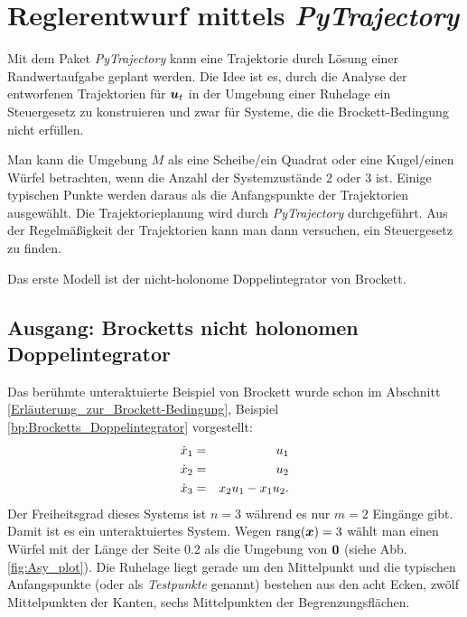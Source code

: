\section{Reglerentwurf mittels \emph{PyTrajectory}}
\label{sec:Reglerentwurf_mittels_PyTrajectory}
Mit dem Paket \emph{PyTrajectory} kann eine Trajektorie durch Lösung einer Randwertaufgabe geplant werden. Die Idee ist es, durch die Analyse der entworfenen Trajektorien für $\boldsymbol u_{t}$ in der Umgebung einer Ruhelage ein Steuergesetz zu konstruieren und zwar für Systeme, die die Brockett-Bedingung nicht erfüllen.

Man kann die Umgebung $M$ als eine Scheibe/ein Quadrat oder eine Kugel/einen Würfel betrachten, wenn die Anzahl der Systemzustände $2$ oder $3$ ist. Einige typischen Punkte werden daraus als die Anfangspunkte der Trajektorien ausgewählt. Die Trajektorieplanung wird durch \emph{PyTrajectory} durchgeführt. Aus der Regelmäßigkeit der Trajektorien kann man dann versuchen, ein Steuergesetz zu finden.   

Das erste Modell ist der nicht-holonome Doppelintegrator von Brockett. 

\subsection{Ausgang: Brocketts nicht holonomen Doppelintegrator}
\label{subs:Ausgang_Brocketts_nicht_holonimischer_Doppelintegrator}
Das berühmte unteraktuierte Beispiel von Brockett wurde schon im Abschnitt \ref{Erläuterung_zur_Brockett-Bedingung}, Beispiel \ref{bp:Brocketts_Doppelintegrator} vorgestellt:
\begin{eqnarray}
\dot{x}_{1} &=& u_{1}\notag\\
\dot{x}_{2} &=& u_{2}\notag\\
\dot{x}_{3} &=& x_{2}u_{1}-x_{1}u_{2}.
\label{eq:Brockett_Doppelintegrator_ch4}
\end{eqnarray}
Der Freiheitsgrad dieses Systems ist $n=3$ während es nur $m=2$ Eingänge gibt. Damit ist es ein unteraktuiertes System. Wegen $\mathrm{rang{(\boldsymbol x)}=3}$ wählt man einen Würfel mit der Länge der Seite $0.2$ als die Umgebung von $\boldsymbol 0$ (siehe Abb. \ref{fig:Asy_plot}). Die Ruhelage liegt gerade um den Mittelpunkt und die typischen Anfangspunkte (oder als \emph{Testpunkte} genannt) bestehen aus den acht Ecken, zwölf Mittelpunkten der Kanten, sechs Mittelpunkten der Begrenzungsflächen. 

